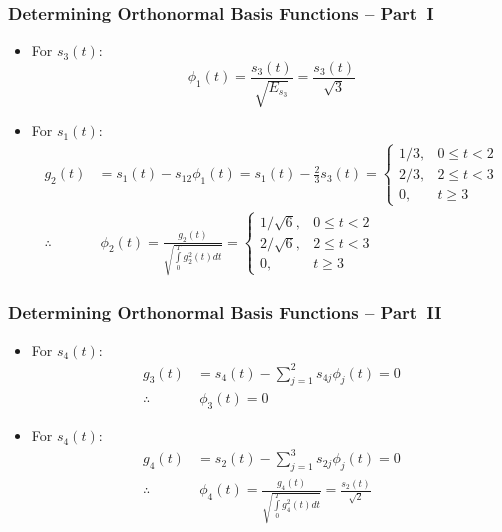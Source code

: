 \documentclass[10pt]{beamer}
\begin{document}
\frame
{
  \frametitle{Determining Orthonormal Basis Functions -- Part~I}

    \begin{itemize}
        \item For $s_3(t)$:
        \begin{equation}
            \phi_1(t)=\frac{s_3(t)}{\sqrt{E_{s_3}}}=\frac{s_3(t)}{\sqrt{3}}\nonumber
        \end{equation}
        \item For $s_1(t)$:
        \begin{equation}
        \begin{split}
            g_2(t)&=s_1(t)-s_{12}\phi_1(t)=s_1(t)-\frac{2}{3}s_3(t)=\left\{
            \begin{array}{cc}
              1/3, & 0\le{t}<2 \\
              2/3, & 2\le{t}<3 \\
              0,   & t\ge{3}
            \end{array}
            \right.\\
            \therefore&~\phi_2(t)=\frac{g_2(t)}{\sqrt{\int\limits_0^Tg_2^2(t)dt}}=\left\{
            \begin{array}{cc}
              1/\sqrt{6}, & 0\le{t}<2 \\
              2/\sqrt{6}, & 2\le{t}<3 \\
              0,   & t\ge{3}
            \end{array}
            \right.\nonumber
        \end{split}
        \end{equation}
    \end{itemize}

}

\frame
{
  \frametitle{Determining Orthonormal Basis Functions -- Part~II}

    \begin{itemize}
        \item For $s_4(t)$:
        \begin{equation}
        \begin{split}
            g_3(t)&=s_4(t)-\sum\limits_{j=1}^{2}s_{4j}\phi_j(t)=0\\
            \therefore&~\phi_3(t)=0\nonumber
        \end{split}
        \end{equation}
        \item For $s_4(t)$:
        \begin{equation}
        \begin{split}
            g_4(t)&=s_2(t)-\sum\limits_{j=1}^{3}s_{2j}\phi_j(t)=0\\
            \therefore&~\phi_4(t)=\frac{g_4(t)}{\sqrt{\int\limits_0^Tg_4^2(t)dt}}=\frac{s_2(t)}{\sqrt{2}}\nonumber
        \end{split}
        \end{equation}
    \end{itemize}


}
\end{document}
